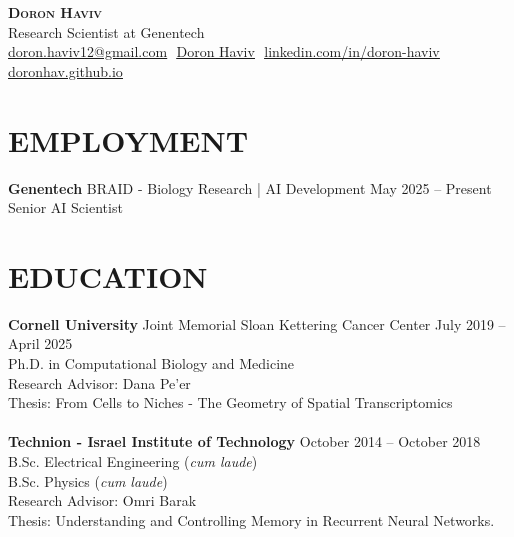 \documentclass[a4paper,9pt]{extarticle}
\begin{document}
\pagestyle{fancy}
\renewcommand{\headrulewidth}{0pt}
\fancyhead{}
\thispagestyle{empty} %

\begin{center}
    \textbf{\Huge \scshape Doron Haviv} \\ 
    \Large{Research Scientist at Genentech} \\ 
    \small
    \vspace{4pt} 
    \href{mailto:doron.haviv12@gmail.com}
    {\underline{doron.haviv12@gmail.com}}  $  $
    \href{https://scholar.google.com/citations?user=tWeeha4AAAAJ&hl=en&oi=ao}{\underline{Doron Haviv}} $  $
    \href{https://www.linkedin.com/in/doron-haviv-92ab63138/}{\underline{linkedin.com/in/doron-haviv}} $  $
    \href{https://doronhav.github.io}{\underline{doronhav.github.io}}
\end{center}


\section*{EMPLOYMENT}
\noindent
\textbf{Genentech} \footnotesize{BRAID - Biology Research | AI Development} \vspace{2pt} \hfill May 2025 – Present \\
\normalsize{Senior AI Scientist}

\section*{EDUCATION}
\noindent
\textbf{Cornell University} \footnotesize{Joint Memorial Sloan Kettering Cancer Center} \vspace{2pt} \hfill July 2019 – April 2025 \\
\normalsize{Ph.D. in Computational Biology and Medicine\vspace{4pt}} \\ 
\indent Research Advisor: Dana Pe’er \\
\indent Thesis: From Cells to Niches - The Geometry of Spatial Transcriptomics \\

\noindent\\
\normalsize{\textbf{Technion - Israel Institute of Technology}\vspace{2pt}}   \hfill \footnotesize{October 2014 – October 2018}\\ 
\normalsize{B.Sc. Electrical Engineering (\textit{cum laude})\vspace{4pt}}\\
\normalsize{B.Sc. Physics (\textit{cum laude})\vspace{4pt}}\\
\indent Research Advisor: Omri Barak \\
\indent Thesis: Understanding and Controlling Memory in Recurrent Neural Networks. \\
\end{document}
